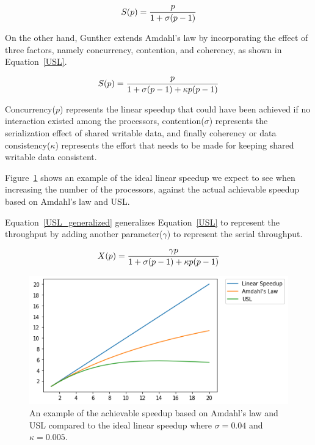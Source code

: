 \begin{equation}\label{Amdahl}
S(p) = \frac{p}{1+\sigma(p-1)}\\
\end{equation}

On the other hand, Gunther\cite{gunther2007guerrilla} extends Amdahl's law by incorporating the effect of three factors, namely concurrency, contention, and coherency, as shown in Equation~\ref{USL}.

\begin{equation}\label{USL}
S(p) = \frac{p}{1+\sigma(p-1)+\kappa{p}(p-1)}\\
\end{equation}

Concurrency($p$) represents the linear speedup that could have been achieved if no interaction existed among the processors, contention($\sigma$) represents the serialization effect of shared writable data, and finally coherency or data consistency($\kappa$) represents the effort that needs to be made for keeping shared writable data consistent\cite{gunther2007guerrilla}.    

Figure~\ref{fig_Amdahl} shows an example of the ideal linear speedup we expect to see when increasing the number of the processors, against the actual achievable speedup based on Amdahl's law and USL.

Equation~\ref{USL_generalized} generalizes Equation~\ref{USL} to represent the throughput by adding another parameter($\gamma$) to represent the serial throughput.

\begin{equation}\label{USL_generalized}
X(p) = \frac{\gamma{p}}{1+\sigma(p-1)+\kappa{p}(p-1)}\\
\end{equation}

\begin{figure}[H]
	\centering
	\includegraphics[width=1\linewidth]{images/Amdahls.png}
	\caption{An example of the achievable speedup based on Amdahl's law and USL compared to the ideal linear speedup where $\sigma=0.04$ and $\kappa=0.005$.}	
	\label{fig_Amdahl}
\end{figure}

